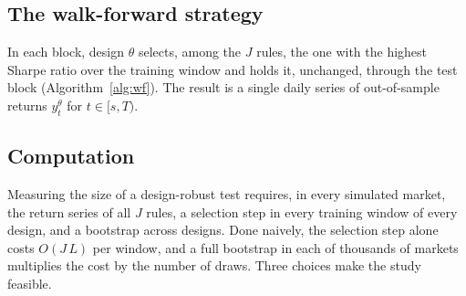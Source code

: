 \documentclass[pdflatex,sn-basic]{sn-jnl}
\theoremstyle{thmstyleone}
\theoremstyle{thmstylethree}
\begin{document}
\subsection{The walk-forward strategy}

In each block, design $\theta$ selects, among the $J$ rules, the one with the highest Sharpe ratio over
the training window and holds it, unchanged, through the test block (Algorithm~\ref{alg:wf}). The result
is a single daily series of out-of-sample returns $y^{\theta}_t$ for $t\in[s,T)$.

\begin{algorithm}[tbp]
\caption{Walk-forward meta-strategy for design $\theta$}\label{alg:wf}
\DontPrintSemicolon
{}
\Output{out-of-sample returns $y^{\theta}_t$ for $t\in[s,T)$}
\end{algorithm}

\subsection{Computation}\label{sec:computation}

Measuring the size of a design-robust test requires, in every simulated market, the return series of
all $J$ rules, a selection step in every training window of every design, and a bootstrap across
designs. Done naively, the selection step alone costs $O(J\,L)$ per window, and a full bootstrap in each
of thousands of markets multiplies the cost by the number of draws. Three choices make the study
feasible.
\end{document}
